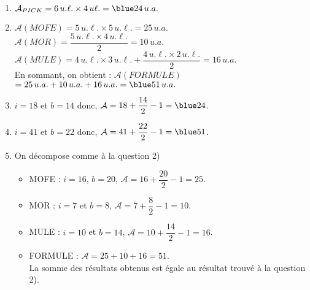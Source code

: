 \begin{corrige}
   \begin{enumerate}
      \item $\mathcal{A}_{PICK} =6\,u.\ell.\times4\,u\ell. ={\blue 24\,u.a.}$
      \item $\mathcal{A}(MOFE) =5\,u.\ell.\times5\,u.\ell. =25\,u.a.$ \\ [1mm] 
         $\mathcal{A}(MOR) =\dfrac{5\,u.\ell.\times4\,u.\ell.}{2} =10\,u.a.$ \\ [1mm]
         $\mathcal{A}(MULE) =4\,u.\ell.\times3\,u.\ell.+\dfrac{4\,u.\ell.\times2\,u.\ell.}{2} =16\,u.a.$ \\ [1mm]
         En sommant, on obtient : $\mathcal{A}(FORMULE)$ \\
         $=25\,u.a.+10\,u.a.+16\,u.a. ={\blue 51\,u.a.}$ \smallskip
      \item {\blue $i =18$} et {\blue $b =14$} donc, $\mathcal{A} =18+\dfrac{14}{2}-1 ={\blue 24}$. \smallskip
      \item {\blue $i =41$} et {\blue $b =22$} donc, $\mathcal{A} =41+\dfrac{22}{2}-1 ={\blue 51}$. \smallskip
      \item On décompose comme à la question 2)
         \begin{itemize}
            \item MOFE : $i =16$, $b =20$, $\mathcal{A} =16+\dfrac{20}{2}-1 =25$. \smallskip
            \item MOR : $i =7$ et $b =8$, $\mathcal{A} =7+\dfrac{8}{2}-1 =10$. \smallskip
            \item MULE : $i =10$ et $b =14$, $\mathcal{A} =10+\dfrac{14}{2}-1 =16$. \smallskip
            \item FORMULE : $\mathcal{A} =25+10+16 =51$. \\
         {\blue La somme des résultats obtenus est égale au résultat trouvé à la question 2).}
      \end{itemize}
   \end{enumerate}
\end{corrige}
